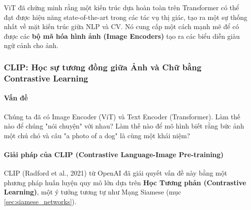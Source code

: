 ViT đã chứng minh rằng một kiến trúc dựa hoàn toàn trên Transformer có thể đạt được hiệu năng state-of-the-art trong các tác vụ thị giác, tạo ra một sự thống nhất về mặt kiến trúc giữa NLP và CV. Nó cung cấp một cách mạnh mẽ để có được các \textbf{bộ mã hóa hình ảnh (Image Encoders)} tạo ra các biểu diễn giàu ngữ cảnh cho ảnh.

\subsubsection{CLIP: Học sự tương đồng giữa Ảnh và Chữ bằng Contrastive Learning}
\paragraph{Vấn đề}
Chúng ta đã có Image Encoder (ViT) và Text Encoder (Transformer). Làm thế nào để chúng "nói chuyện" với nhau? Làm thế nào để mô hình biết rằng bức ảnh một chú chó và câu "a photo of a dog" là cùng một khái niệm?

\paragraph{Giải pháp của CLIP (Contrastive Language-Image Pre-training)}
CLIP (Radford et al., 2021) từ OpenAI đã giải quyết vấn đề này bằng một phương pháp huấn luyện quy mô lớn dựa trên \textbf{Học Tương phản (Contrastive Learning)}, một ý tưởng tương tự như Mạng Siamese (mục \ref{sec:siamese_networks}).

